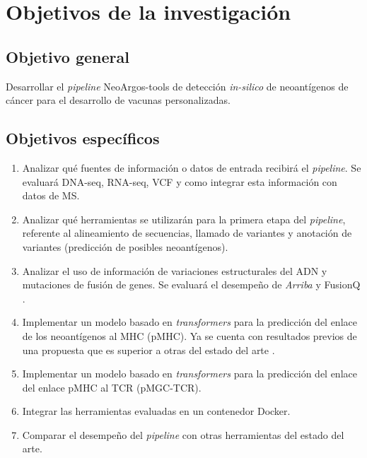 \documentclass[a4paper,11pt]{article}
\begin{document}
	
\section{Objetivos de la investigación}
	
	\subsection{Objetivo general}
	
	Desarrollar el \textit{pipeline} NeoArgos-tools de detección \textit{in-silico} de neoantígenos de cáncer para el desarrollo de vacunas personalizadas.
	
	\subsection{Objetivos específicos}
	\begin{enumerate}
		\item Analizar qué fuentes de información o datos de entrada recibirá el \textit{pipeline}. Se evaluará DNA-seq, RNA-seq, VCF y como integrar esta información con datos de MS.
		
		\item Analizar qué herramientas se utilizarán para la primera etapa del \textit{pipeline}, referente al alineamiento de secuencias, llamado de variantes y  anotación de variantes (predicción de posibles neoantígenos). 
		
		\item Analizar el uso de información de variaciones estructurales del ADN y mutaciones de fusión de genes. Se evaluará el desempeño de \textit{Arriba} \citep{uhrig2021accurate} y FusionQ \citep{liu2013fusionq}.
		 
		\item Implementar un modelo basado en \textit{transformers} para la predicción del enlace de los neoantígenos al MHC (pMHC). Ya se cuenta con resultados previos de una propuesta que es superior a otras del estado del arte \citep{arceda2023neoantigen}.

        \item Implementar un modelo basado en \textit{transformers} para la predicción del enlace del enlace pMHC al TCR (pMGC-TCR). 
       
		\item Integrar las herramientas evaluadas en un contenedor Docker.
		\item Comparar el desempeño del \textit{pipeline} con otras herramientas del estado del arte.

		
	\end{enumerate}
\end{document}
